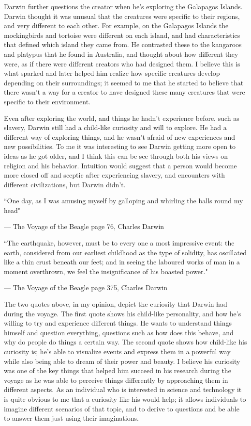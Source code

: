\documentclass[11pt, oneside]{article}
\begin{document}
\par Darwin further questions the creator when he's exploring the Galapagos Islands. Darwin thought it was unusual that the creatures were specific to their regions, and very different to each other. For example, on the Galapagos Islands the mockingbirds and tortoise were different on each island, and had characteristics that defined which island they came from. He contrasted these to the kangaroos and platypus that he found in Australia, and thought about how different they were, as if there were different creators who had designed them. I believe this is what sparked and later helped him realize how specific creatures develop depending on their surroundings; it seemed to me that he started to believe that there wasn't a way for a creator to have designed these many creatures that were specific to their environment. 


\par Even after exploring the world, and things he hadn't experience before, such as slavery, Darwin still had a child-like curiosity and will to explore. He had a different way of exploring things, and he wasn't afraid of new experiences and new possibilities. To me it was interesting to see Darwin getting more open to ideas as he got older, and I think this can be see through both his views on religion and his behavior. Intuition would suggest that a person would become more closed off and sceptic after experiencing slavery, and encounters with different civilizations, but Darwin didn't. 

\epigraph{``One day, as I was amusing myself by galloping and whirling the balls round my head"}{--- \textup{The Voyage of the Beagle page 76, Charles Darwin}}

\epigraph{``The earthquake, however, must be to every one a most impressive event: the earth, considered from our earliest childhood as the type of solidity, has oscillated like a thin crust beneath our feet; and in seeing the laboured works of man in a moment overthrown, we feel the insignificance of his boasted power."}{--- \textup{The Voyage of the Beagle page 375, Charles Darwin}}

\par The two quotes above, in my opinion, depict the curiosity that Darwin had during the voyage. The first quote shows his child-like personality, and how he's willing to try and experience different things. He wants to understand things himself and question everything, questions such as how does this behave, and why do people do things a certain way. The second quote shows how child-like his curiosity is; he's able to visualize events and express them in a powerful way while also being able to dream of their power and beauty. I believe his curiosity was one of the key things that helped him succeed in his research during the voyage as he was able to perceive things differently by approaching them in different aspects. As an individual who is interested in science and technology it is quite obvious to me that a curiosity like his would help; it allows individuals to imagine different scenarios of that topic, and to derive to questions and be able to answer them just using their imaginations.
\end{document}
